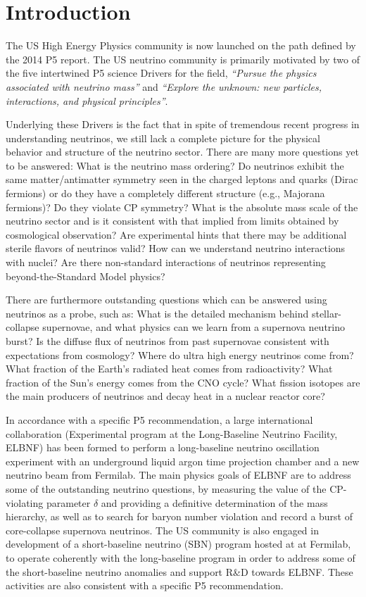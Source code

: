 \section{Introduction}
\label{sec:Introduction}


The US High Energy Physics community is now launched on the path defined by the 2014
P5 report.  The US neutrino community is primarily motivated by two of
the five intertwined P5 science Drivers for the field, 
\textit{``Pursue the physics associated with neutrino mass''} and
\textit{``Explore the unknown: new particles, interactions, and
  physical principles''}.  

Underlying these Drivers is the fact that in spite of tremendous
recent progress in understanding neutrinos, we still lack a complete
picture for the physical behavior and structure of the
neutrino sector. There are many more questions yet to be answered:
What is the neutrino mass ordering? Do neutrinos exhibit the same
matter/antimatter symmetry seen in the charged leptons and quarks
(Dirac fermions) or do they have a completely different structure
(e.g., Majorana fermions)?  Do they violate CP symmetry?  What is the
absolute mass scale of the neutrino sector and is it consistent with
that implied from limits obtained by cosmological observation? Are
experimental hints that there may be additional sterile flavors of
neutrinos valid?  How can we understand neutrino interactions with
nuclei?  Are there non-standard interactions of neutrinos representing
beyond-the-Standard Model physics?  

There are furthermore outstanding questions which can be answered
using neutrinos as a probe, such as: What is the detailed mechanism
behind stellar-collapse supernovae, and what physics can we learn from
a supernova neutrino burst? Is the diffuse flux of neutrinos from past
supernovae consistent with expectations from cosmology?  Where do
ultra high energy neutrinos come from?  What fraction of the Earth's
radiated heat comes from radioactivity?  What fraction of the Sun's
energy comes from the CNO cycle? What fission isotopes are the main 
producers of neutrinos and decay heat in a nuclear reactor core?

In accordance with a specific P5 recommendation, a large international
collaboration (Experimental program at the Long-Baseline Neutrino
Facility, ELBNF) has been formed to perform a long-baseline neutrino
oscillation experiment with an underground liquid argon time
projection chamber and a new neutrino beam from
Fermilab.  The main physics goals of ELBNF are to address some of the
outstanding neutrino questions, by measuring the value of
the CP-violating parameter $\delta$ and providing a definitive
determination of the mass hierarchy, as well as to search for baryon
number violation and record a burst of core-collapse supernova
neutrinos.  The US community is also engaged in development of a
short-baseline neutrino (SBN) program hosted at at Fermilab, to operate
coherently with the long-baseline program in order to address some of the 
short-baseline neutrino anomalies and support R\&D towards ELBNF. 
These activities are also consistent with a
specific P5 recommendation.

